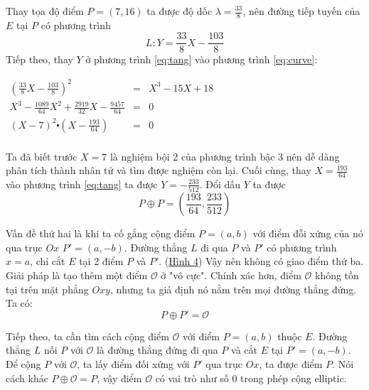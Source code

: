 \documentclass[12pt]{article}
\begin{document}
Thay tọa độ điểm $P = (7,16)$ ta được độ dốc $\lambda = \frac{33}{8}$, nên đường tiếp tuyến của $E$ tại $P$ có phương trình
\begin{equation}
    \label{eq:tang}
    L: Y = \frac{33}{8}X - \frac{103}{8}
\end{equation}
Tiếp theo, thay $Y$ ở phương trình \eqref{eq:tang} vào phương trình \eqref{eq:curve}:
\begin{center}

    $
        \begin{array}{rcl}
            (\frac{33}{8}X - \frac{103}{8})^2                             & = & X^3 -15X+18 \\
            X^3 - \frac{1089}{64}X^2 + \frac{2919}{32}X - \frac{9457}{64} & = & 0           \\
            (X-7)^2 \centerdot (X-\frac{193}{64})                         & = & 0           \\
        \end{array}
    $
\end{center}
Ta đã biết trước $X=7$ là nghiệm bội 2 của phương trình bậc 3 nên dễ dàng phân tích thành nhân tử và tìm được nghiệm còn lại.
Cuối cùng, thay $X=\frac{193}{64}$ vào phương trình \eqref{eq:tang} ta được $Y = -\frac{233}{512}$. Đổi dấu  $Y$ ta được
$$P \oplus P = (\frac{193}{64},\frac{233}{512})$$

Vấn đề thứ hai là khi ta cố gắng cộng điểm $P=(a,b)$ với điểm đỗi xứng của nó qua trục $Ox$ $P'=(a,-b)$.
Đường thẳng $L$ đi qua $P$ và $P'$ có phương trình $x=a$, chỉ cắt $E$ tại 2 điểm $P$ và $P'$. (\hyperref[fg:fg4]{Hình 4})
Vậy nên không có giao điểm thứ ba. Giải pháp là tạo thêm một điểm $\mathcal{O}$ ở "vô cực".
Chính xác hơn, điểm $\mathcal{O}$ không tồn tại trên mặt phẳng $ Oxy$, nhưng ta giả định nó nằm trên mọi đường thẳng đứng.
Ta có:
$$ P \oplus P' = \mathcal{O}$$

Tiếp theo, ta cần tìm cách  cộng điểm $\mathcal{O}$ với điểm $P = (a,b)$ thuộc $E$.
Đường thẳng $L$ nối $P$ với $\mathcal{O}$ là đường thẳng đứng đi qua $P$ và cắt $E$ tại $P'=(a,-b)$.
Để cộng $P$ với $\mathcal{O}$, ta lấy điểm đối xứng với $P'$ qua trục $Ox$, ta được điểm $P$.
Nói cách khác $P \oplus \mathcal{O} = P$, vậy điểm $\mathcal{O}$ có vai trò như số 0 trong phép cộng elliptic.
\end{document}
